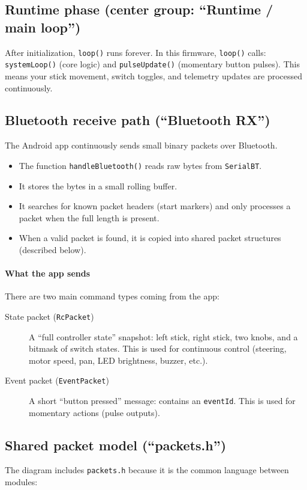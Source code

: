 \documentclass[a3paper,11pt]{article}
\begin{document}
\subsection{Runtime phase (center group: ``Runtime / main loop'')}
After initialization, \texttt{loop()} runs forever. In this firmware, \texttt{loop()} calls:
\texttt{systemLoop()} (core logic) and \texttt{pulseUpdate()} (momentary button pulses).
This means your stick movement, switch toggles, and telemetry updates are processed continuously.

\subsection{Bluetooth receive path (``Bluetooth RX'')}
The Android app continuously sends small binary packets over Bluetooth.

\begin{itemize}
	\item The function \texttt{handleBluetooth()} reads raw bytes from \texttt{SerialBT}.
	\item It stores the bytes in a small rolling buffer.
	\item It searches for known packet headers (start markers) and only processes a packet when the full length is present.
	\item When a valid packet is found, it is copied into shared packet structures (described below).
\end{itemize}

\paragraph{What the app sends}
There are two main command types coming from the app:
\begin{description}
	\item[State packet (\texttt{RcPacket})] A ``full controller state'' snapshot:
	      left stick, right stick, two knobs, and a bitmask of switch states.
	      This is used for continuous control (steering, motor speed, pan, LED brightness, buzzer, etc.).

	\item[Event packet (\texttt{EventPacket})] A short ``button pressed'' message:
	      contains an \texttt{eventId}. This is used for momentary actions (pulse outputs).
\end{description}

\subsection{Shared packet model (``packets.h'')}
The diagram includes \texttt{packets.h} because it is the common language between modules:
\end{document}
